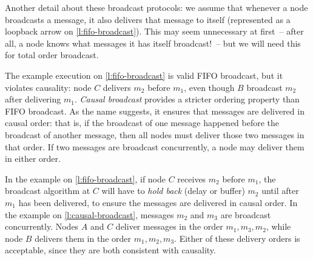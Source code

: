 Another detail about these broadcast protocols: we assume that whenever a node broadcasts a message, it also delivers that message to itself (represented as a loopback arrow on \autoref{l:fifo-broadcast}).
This may seem unnecessary at first~-- after all, a node knows what messages it has itself broadcast!~-- but we will need this for total order broadcast.

The example execution on \autoref{l:fifo-broadcast} is valid FIFO broadcast, but it violates causality: node $C$ delivers $m_2$ before $m_1$, even though $B$ broadcast $m_2$ after delivering $m_1$.
\emph{Causal broadcast} provides a stricter ordering property than FIFO broadcast.
As the name suggests, it ensures that messages are delivered in causal order: that is, if the broadcast of one message happened before the broadcast of another message, then all nodes must deliver those two messages in that order.
If two messages are broadcast concurrently, a node may deliver them in either order.

In the example on \autoref{l:fifo-broadcast}, if node $C$ receives $m_2$ before $m_1$, the broadcast algorithm at $C$ will have to \emph{hold back} (delay or buffer) $m_2$ until after $m_1$ has been delivered, to ensure the messages are delivered in causal order.
In the example on \autoref{l:causal-broadcast}, messages $m_2$ and $m_3$ are broadcast concurrently.
Nodes $A$ and $C$ deliver messages in the order $m_1, m_3, m_2$, while node $B$ delivers them in the order $m_1, m_2, m_3$.
Either of these delivery orders is acceptable, since they are both consistent with causality.

